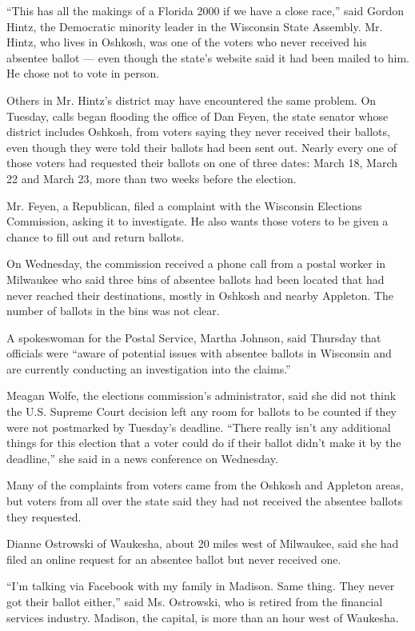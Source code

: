 ``This has all the makings of a Florida 2000 if we have a close race,''
said Gordon Hintz, the Democratic minority leader in the Wisconsin State
Assembly. Mr. Hintz, who lives in Oshkosh, was one of the voters who
never received his absentee ballot --- even though the state's website
said it had been mailed to him. He chose not to vote in person.

Others in Mr. Hintz's district may have encountered the same problem. On
Tuesday, calls began flooding the office of Dan Feyen, the state senator
whose district includes Oshkosh, from voters saying they never received
their ballots, even though they were told their ballots had been sent
out. Nearly every one of those voters had requested their ballots on one
of three dates: March 18, March 22 and March 23, more than two weeks
before the election.

Mr. Feyen, a Republican, filed a complaint with the Wisconsin Elections
Commission, asking it to investigate. He also wants those voters to be
given a chance to fill out and return ballots.

On Wednesday, the commission received a phone call from a postal worker
in Milwaukee who said three bins of absentee ballots had been located
that had never reached their destinations, mostly in Oshkosh and nearby
Appleton. The number of ballots in the bins was not clear.

A spokeswoman for the Postal Service, Martha Johnson, said Thursday that
officials were ``aware of potential issues with absentee ballots in
Wisconsin and are currently conducting an investigation into the
claims.''

Meagan Wolfe, the elections commission's administrator, said she did not
think the U.S. Supreme Court decision left any room for ballots to be
counted if they were not postmarked by Tuesday's deadline. ``There
really isn't any additional things for this election that a voter could
do if their ballot didn't make it by the deadline,'' she said in a news
conference on Wednesday.

Many of the complaints from voters came from the Oshkosh and Appleton
areas, but voters from all over the state said they had not received the
absentee ballots they requested.

Dianne Ostrowski of Waukesha, about 20 miles west of Milwaukee, said she
had filed an online request for an absentee ballot but never received
one.

``I'm talking via Facebook with my family in Madison. Same thing. They
never got their ballot either,'' said Ms. Ostrowski, who is retired from
the financial services industry. Madison, the capital, is more than an
hour west of Waukesha.

